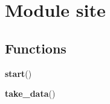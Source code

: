 %
%
%


\section{Module site}

    \label{site}


  \subsection{Functions}

    \label{site:start}

    \vspace{0.5ex}

\hspace{.8\funcindent}\begin{boxedminipage}{\funcwidth}

    \raggedright \textbf{start}()

\setlength{\parskip}{2ex}
\setlength{\parskip}{1ex}
    \end{boxedminipage}

    \label{site:take_data}

    \vspace{0.5ex}

\hspace{.8\funcindent}\begin{boxedminipage}{\funcwidth}

    \raggedright \textbf{take\_data}()

\setlength{\parskip}{2ex}
\setlength{\parskip}{1ex}
    \end{boxedminipage}



